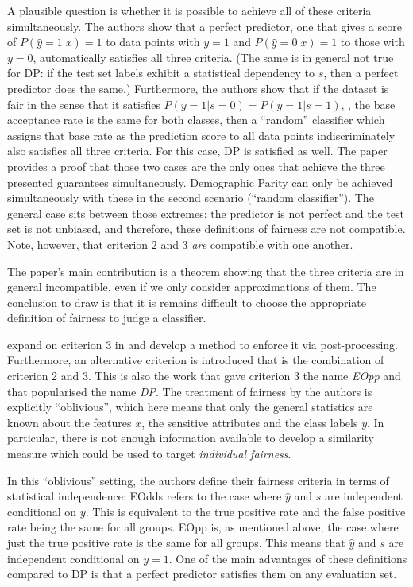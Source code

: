 A plausible question is whether it is possible to achieve all of these criteria simultaneously. The
authors show that a perfect predictor, \ie one that gives a score of \(P(\hat{y}=1|x) = 1\) to data
points with \(y=1\) and \(P(\hat{y}=0|x) = 1\) to those with \(y=0\), automatically satisfies all
three criteria. (The same is in general not true for \ac{DP}: if the test set labels exhibit a
statistical dependency to $s$, then a perfect predictor does the same.) Furthermore, the authors
show that if the dataset is fair in the sense that it satisfies \(P(y=1|s=0) = P(y=1|s=1)\), \ie,
the base acceptance rate is the same for both classes, then a ``random'' classifier which assigns
that base rate as the prediction score to all data points indiscriminately also satisfies all three
criteria. For this case, \ac{DP} is satisfied as well. The paper provides a proof that those two
cases are the only ones that achieve the three presented guarantees simultaneously. Demographic
Parity can only be achieved simultaneously with these in the second scenario (``random
classifier''). The general case sits between those extremes: the predictor is not perfect and the
test set is not unbiased, and therefore, these definitions of fairness are not compatible. Note,
however, that criterion 2 and 3 \emph{are} compatible with one another.

The paper's main contribution is a theorem showing that the three criteria are in general
incompatible, even if we only consider approximations of them. The conclusion to draw is that it is
remains difficult to choose the appropriate definition of fairness to judge a classifier.

\citet{hardt2016equality} expand on criterion 3 in \citet{kleinberg2016inherent} and develop a
method to enforce it via post-processing. Furthermore, an alternative criterion is introduced that
is the combination of criterion 2 and 3. This is also the work that gave criterion 3 the name
\emph{\acl{EOpp}} and that popularised the name \emph{\acl{DP}}. The treatment of fairness by the
authors is explicitly ``oblivious'', which here means that only the general statistics are known
about the features \(x\), the sensitive attributes and the class labels \(y\). In particular, there
is not enough information available to develop a similarity measure which could be used to target
\emph{individual fairness}.

In this ``oblivious'' setting, the authors define their fairness criteria in terms of statistical
independence: \acf{EOdds} refers to the case where \(\hat{y}\) and \(s\) are independent
conditional on \(y\). This is equivalent to the true positive rate and the false positive rate
being the same for all groups. \Acf{EOpp} is, as mentioned above, the case where just the true
positive rate is the same for all groups. This means that \(\hat{y}\) and \(s\) are independent
conditional on \(y=1\). One of the main advantages of these definitions compared to \ac{DP} is that
a perfect predictor satisfies them on any evaluation set.

